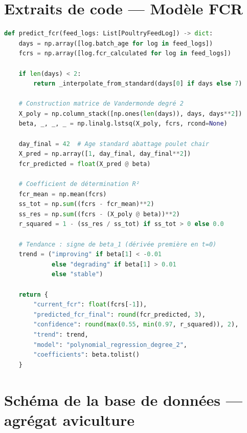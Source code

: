 \chapter{Extraits de code — Modèle FCR}
\label{ann:fcr_code}

\begin{lstlisting}[language=python, caption={Implémentation de la régression polynomiale FCR}]
def predict_fcr(feed_logs: List[PoultryFeedLog]) -> dict:
    days = np.array([log.batch_age for log in feed_logs])
    fcrs = np.array([log.fcr_calculated for log in feed_logs])

    if len(days) < 2:
        return _interpolate_from_standard(days[0] if days else 7)

    # Construction matrice de Vandermonde degré 2
    X_poly = np.column_stack([np.ones(len(days)), days, days**2])
    beta, _, _, _ = np.linalg.lstsq(X_poly, fcrs, rcond=None)

    day_final = 42  # Age standard abattage poulet chair
    X_pred = np.array([1, day_final, day_final**2])
    fcr_predicted = float(X_pred @ beta)

    # Coefficient de détermination R²
    fcr_mean = np.mean(fcrs)
    ss_tot = np.sum((fcrs - fcr_mean)**2)
    ss_res = np.sum((fcrs - (X_poly @ beta))**2)
    r_squared = 1 - (ss_res / ss_tot) if ss_tot > 0 else 0.0

    # Tendance : signe de beta_1 (dérivée première en t=0)
    trend = ("improving" if beta[1] < -0.01
             else "degrading" if beta[1] > 0.01
             else "stable")

    return {
        "current_fcr": float(fcrs[-1]),
        "predicted_fcr_final": round(fcr_predicted, 3),
        "confidence": round(max(0.55, min(0.97, r_squared)), 2),
        "trend": trend,
        "model": "polynomial_regression_degree_2",
        "coefficients": beta.tolist()
    }
\end{lstlisting}

\chapter{Schéma de la base de données — agrégat aviculture}
\label{ann:schema_poultry}

